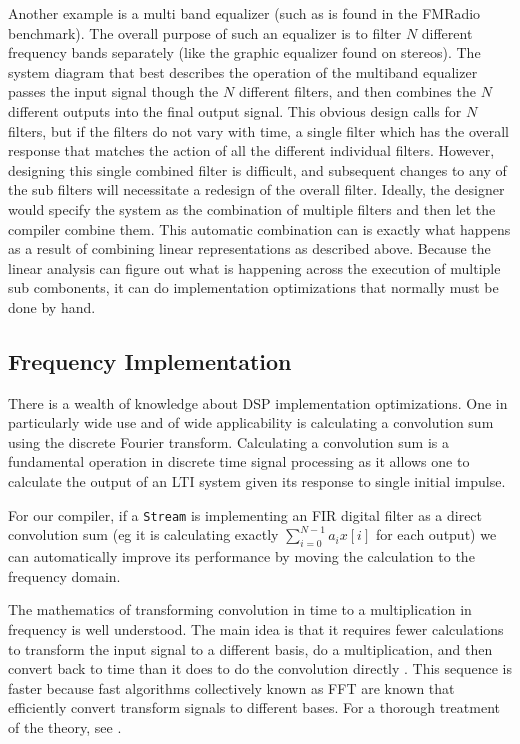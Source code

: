Another example is a multi band equalizer (such as is found in the FMRadio benchmark). 
The overall purpose of such an equalizer is to filter $N$ different frequency bands 
separately (like the graphic equalizer found on stereos). 
The system diagram that best describes the operation of the multiband equalizer
passes the input signal though the $N$ different filters, and then combines the $N$
different outputs into the final output signal.
This obvious design calls for $N$ filters, but if the filters do not vary with time, 
a single filter which has the overall response that matches the action of all the 
different individual filters. However, designing this single combined filter is 
difficult, and subsequent changes to any of the sub filters will necessitate a
redesign of the overall filter. Ideally, the designer would specify the system as
the combination of multiple filters and then let the compiler combine them. 
This automatic combination can is exactly what happens as a result of combining
linear representations as described above. Because the linear analysis can
figure out what is happening across the execution of multiple sub combonents, 
it can do implementation optimizations that normally must be done by hand.


\subsection{Frequency Implementation}
There is a wealth of knowledge about DSP implementation optimizations. One in
particularly wide use and of wide applicability is calculating a convolution sum 
using the discrete Fourier transform. Calculating a convolution sum is a fundamental
operation in discrete time signal processing as it allows one to calculate the output
of an LTI system given its response to single initial impulse.

For our compiler, if a {\tt Stream} is implementing an FIR digital filter as a direct 
convolution sum (eg it is calculating exactly $\sum_{i=0}^{N-1}a_{i}x[i]$ for each output)
we can automatically improve its performance by moving the calculation to the frequency
domain. 

The mathematics of transforming convolution in time to a multiplication in frequency 
is well understood. The main idea is that it requires fewer calculations to transform
the input signal to a different basis, do a multiplication, and then convert back 
to time than it does to do the convolution directly . This sequence is faster because 
fast algorithms collectively known as FFT are known that efficiently convert transform
signals to different bases. For a thorough treatment of the theory, see
\cite{oppenheim-discrete}.

